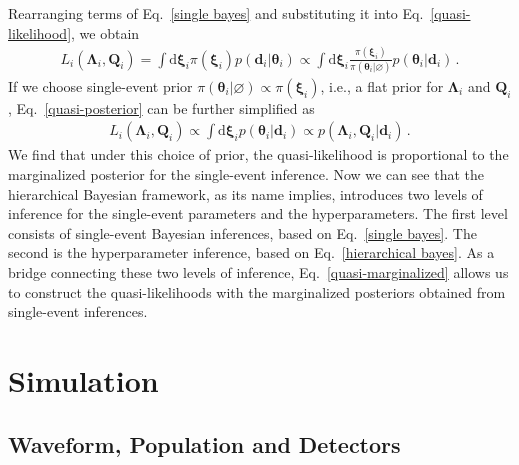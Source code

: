 \documentclass[a4paper,11pt]{article}
\begin{document}
Rearranging terms of Eq.~\eqref{single bayes} and substituting it into Eq.~\eqref{quasi-likelihood}, we obtain
\begin{equation}
\label{quasi-posterior}
\begin{aligned}
    L_i(\bm{\Lambda}_i,\bm{Q}_i) = \int \text{d}\bm{\xi}_i \pi(\bm{\xi}_i)p(\bm{d}_i|\bm{\theta}_i) \propto \int \text{d}\bm{\xi}_i \frac{\pi(\bm{\xi}_i)}{\pi(\bm{\theta}_i|\varnothing)}p(\bm{\theta}_i|\bm{d}_i)\,.
\end{aligned}  
\end{equation}
If we choose single-event prior $\pi(\bm{\theta}_i|\varnothing)\propto\pi(\bm{\xi}_i)$, i.e., a flat prior for $\bm{\Lambda}_i$ and $\bm{Q}_i$, Eq.~\eqref{quasi-posterior} can be further simplified as 
\begin{equation}
\label{quasi-marginalized}
\begin{aligned}
    L_i(\bm{\Lambda}_i,\bm{Q}_i) \propto \int \text{d}\bm{\xi}_i p(\bm{\theta}_i|\bm{d}_i)\propto p(\bm{\Lambda}_i,\bm{Q}_i|\bm{d}_i)\,.
\end{aligned}  
\end{equation}
We find that under this choice of prior, the quasi-likelihood is proportional to the marginalized posterior for the single-event inference. Now we can see that the hierarchical Bayesian framework, as its name implies, introduces two levels of inference for the single-event parameters and the hyperparameters. The first level consists of single-event Bayesian inferences, based on Eq.~\eqref{single bayes}. The second is the hyperparameter inference, based on Eq.~\eqref{hierarchical bayes}. As a bridge connecting these two levels of inference, Eq.~\eqref{quasi-marginalized} allows us to construct the quasi-likelihoods with the marginalized posteriors obtained from single-event inferences.


\section{Simulation}
\label{sec:simulation}

\subsection{Waveform, Population and Detectors}
\label{subsec:simulation_preliminaries}
\end{document}
